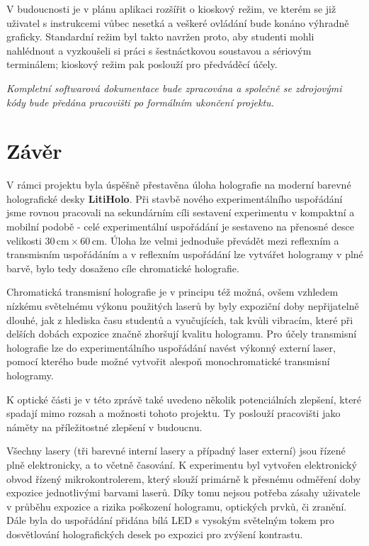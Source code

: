 \documentclass[twoside,project]{../MFFPrace}
\begin{document}
\medskip

V budoucnosti je v plánu aplikaci rozšířit o kioskový režim, ve kterém se již uživatel s instrukcemi vůbec nesetká a veškeré ovládání bude konáno výhradně graficky. Standardní režim byl takto navržen proto, aby studenti mohli nahlédnout a vyzkoušeli si práci s šestnáctkovou soustavou a sériovým terminálem; kioskový režim pak poslouží pro předváděcí účely.


\vfill
\noindent
\textit{Kompletní softwarová dokumentace bude zpracována a společně se zdrojovými kódy bude předána pracovišti po formálním ukončení projektu.}
\chapter*{Závěr}
V rámci projektu byla úspěšně přestavěna úloha holografie na moderní barevné holografické desky \textbf{LitiHolo}. Při stavbě nového experimentálního uspořádání jsme rovnou pracovali na sekundárním cíli sestavení experimentu v kompaktní a mobilní podobě - celé experimentální uspořádání je sestaveno na přenosné desce velikosti $30\,\text{cm}\times 60\,\text{cm}$. Úloha lze velmi jednoduše převádět mezi reflexním a transmisním uspořádáním a v reflexním uspořádání lze vytvářet hologramy v plné barvě, bylo tedy dosaženo cíle chromatické holografie.

Chromatická transmisní holografie je v principu též možná, ovšem vzhledem nízkému světelnému výkonu použitých laserů by byly expoziční doby nepřijatelně dlouhé, jak z hlediska času studentů a vyučujících, tak kvůli vibracím, které při delších dobách expozice značně zhoršují kvalitu hologramu. Pro účely transmisní holografie lze do experimentálního uspořádání navést výkonný externí laser, pomocí kterého bude možné vytvořit alespoň monochromatické transmisní hologramy.

K optické části je v této zprávě také uvedeno několik potenciálních zlepšení, které spadají mimo rozsah a možnosti tohoto projektu. Ty poslouží pracovišti jako náměty na příležitostné zlepšení v budoucnu.

\medskip

Všechny lasery (tři barevné interní lasery a případný laser externí) jsou řízené plně elektronicky, a to včetně časování. K experimentu byl vytvořen elektronický obvod řízený mikrokontrolerem, který slouží primárně k přesnému odměření doby expozice jednotlivými barvami laserů. Díky tomu nejsou potřeba zásahy uživatele v průběhu expozice a rizika poškození hologramu, optických prvků, či zranění. Dále byla do uspořádání přidána bílá LED s vysokým světelným tokem pro dosvětlování holografických desek po expozici pro zvýšení kontrastu.
\end{document}
